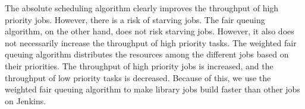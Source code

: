 The absolute scheduling algorithm clearly improves the throughput of high priority jobs. However, there is a risk of starving jobs. The fair queuing algorithm, on the other hand, does not risk starving jobs. However, it also does not necessarily increase the throughput of high priority tasks. The weighted fair queuing algorithm distributes the resources among the different jobs based on their priorities. The throughput of high priority jobs is increased, and the throughput of low priority tasks is decreased. Because of this, we use the weighted fair queuing algorithm to make library jobs build faster than other jobs on Jenkins.
